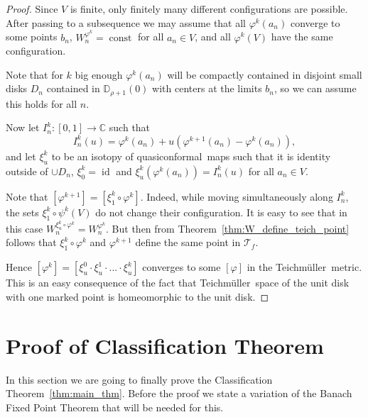 \documentclass[10pt,reqno,a4paper]{amsart}
\numberwithin{figure}{section}
\numberwithin{equation}{section}
\newcommand{\tei}{Teichm\"uller}
\newcommand{\qc}{quasiconformal}
\newcommand{\const}{\operatorname{const}}
\newcommand{\id}{\operatorname{id}}
\begin{document}
\begin{proof}
	Since $V$ is finite, only finitely many different configurations are possible. After passing to a subsequence we may assume that all $\varphi^k(a_n)$ converge to some points $b_n$, $W_n^{\varphi^k}=\const$ for all $a_n\in V$,  and all $\varphi^k(V)$ have the same configuration.
	
	Note that for $k$ big enough $\varphi^k(a_n)$ will be compactly contained in disjoint small disks $D_n$ contained in $\mathbb{D}_{\rho+1}(0)$ with centers at the limits $b_n$, so we can assume this holds for all $n$.
	
	Now let $I_n^k:[0,1]\to\mathbb{C}$ such that $$I_n^k(u)=\varphi^k(a_n)+u(\varphi^{k+1}(a_n)-\varphi^k(a_n)),$$ and let $\xi_u^k$ to be an isotopy of \qc\ maps such that it is identity outside of $\cup D_n$, $\xi_0^k=\id$ and $\xi_u^k(\varphi^k(a_n))=I_n^k(u)$ for all $a_n\in V$.
	
	Note that $[\varphi^{k+1}]=[\xi_1^k\circ\varphi^k]$. Indeed, while moving simultaneously along $I_n^k$, the sets $\xi_1^k\circ\psi^k(V)$ do not change their configuration. It is easy to see that in this case $W_n^{\xi_u^k\circ\varphi^k}=W_n^{\varphi^k}$. But then from Theorem~\ref{thm:W_define_teich_point} follows that $\xi_1^k\circ\varphi^k$ and $\varphi^{k+1}$ define the same point in $\mathcal{T}_f$.
	
	Hence $[\varphi^k]=[\xi_u^0\cdot\xi_u^1\cdot...\cdot\xi_u^k]$ converges to some $[\varphi]$ in the \tei\ metric. This is an easy consequence of the fact that \tei\ space of the unit disk with one marked point is homeomorphic to the unit disk.
\end{proof}

\section{Proof of Classification Theorem}

In this section we are going to finally prove the Classification Theorem~\ref{thm:main_thm}. Before the proof we state a variation of the Banach Fixed Point Theorem that will be needed for this.
\end{document}
